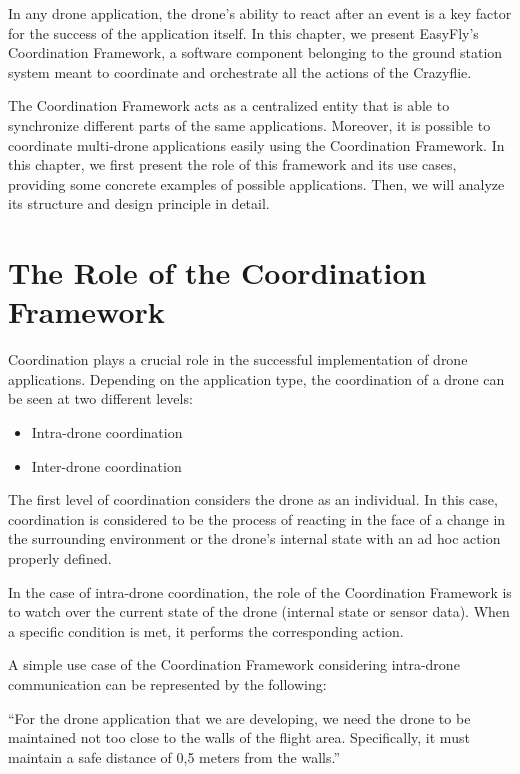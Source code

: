In any drone application, the drone's ability to react after an event is a key factor for the success of the application itself. 
In this chapter, we present EasyFly's Coordination Framework, a software component belonging to the ground station system meant to coordinate and orchestrate all the actions of the Crazyflie. 

The Coordination Framework acts as a centralized entity that is able to synchronize different parts of the same applications.
Moreover, it is possible to coordinate multi-drone applications easily using the Coordination Framework.
In this chapter, we first present the role of this framework and its use cases, providing some concrete examples of possible applications. 
Then, we will analyze its structure and design principle in detail.


\section{The Role of the Coordination Framework}\label{sec:coordination_framework_rolw}

Coordination plays a crucial role in the successful implementation of drone applications. 
Depending on the application type, the coordination of a drone can be seen at two different levels:
\begin{itemize}
    \item Intra-drone coordination
    \item Inter-drone coordination
\end{itemize}

The first level of coordination considers the drone as an individual. 
In this case, coordination is considered to be the process of reacting in the face of a change in the surrounding environment or the drone's internal state with an ad hoc action properly defined.

In the case of intra-drone coordination, the role of the Coordination Framework is to watch over the current state of the drone (internal state or sensor data). 
When a specific condition is met, it performs the corresponding action.

A simple use case of the Coordination Framework considering intra-drone communication can be represented by the following:

\begin{displayquote}
    “For the drone application that we are developing, we need the drone to be maintained not too close to the walls of the flight area. 
    Specifically, it must maintain a safe distance of 0,5 meters from the walls.”
\end{displayquote}

